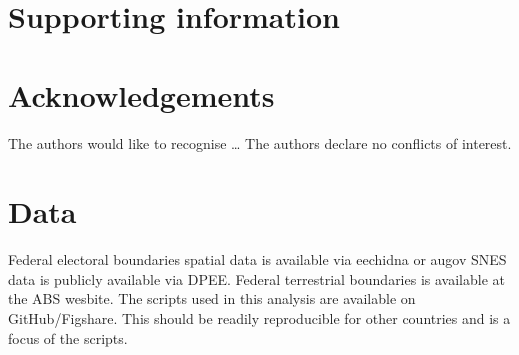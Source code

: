 \documentclass[a4paper,11pt]{article}
\begin{document}
\newpage
\section{Supporting information}

\newpage
\section{Acknowledgements}
The authors would like to recognise \ldots
The authors declare no conflicts of interest.

\newpage
\section{Data}
Federal electoral boundaries spatial data is available via eechidna or augov
SNES data is publicly available via DPEE.
Federal terrestrial boundaries is available at the ABS wesbite.
The scripts used in this analysis are available on GitHub/Figshare. This should be readily reproducible for other countries and is a focus of the scripts.
\end{document}
